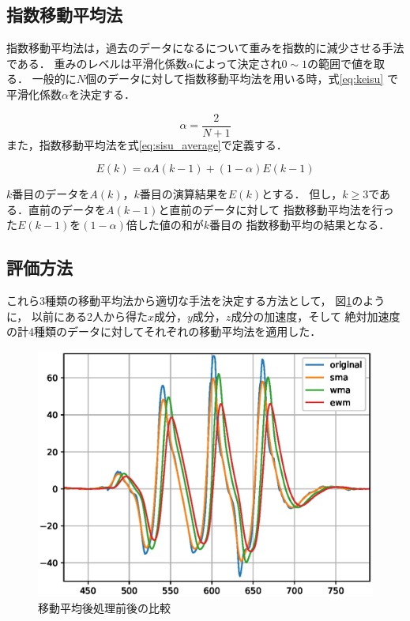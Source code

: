 \subsection{指数移動平均法}

指数移動平均法は，過去のデータになるについて重みを指数的に減少させる手法である．
重みのレベルは平滑化係数$\alpha$によって決定され$0 \sim 1$の範囲で値を取る．
一般的に$N$個のデータに対して指数移動平均法を用いる時，式\ref{eq:keisu}
で平滑化係数$\alpha$を決定する．

\begin{equation}
    \alpha = \frac{2}{N + 1}
    \label{eq:keisu}
\end{equation}
また，指数移動平均法を式\ref{eq:sisu_average}で定義する．

\begin{equation}
    E(k) = \alpha A(k - 1) + (1 - \alpha)E(k - 1)
    \label{eq:sisu_average}
\end{equation}

$k$番目のデータを$A(k)$，$k$番目の演算結果を$E(k)$とする．
但し，$k \geq 3$である．直前のデータを$A(k - 1)$と直前のデータに対して
指数移動平均法を行った$E(k - 1)$を$(1- \alpha)$倍した値の和が$k$番目の
指数移動平均の結果となる．

\subsection{評価方法}

これら3種類の移動平均法から適切な手法を決定する方法として，
図\ref{fig:average}のように，
以前にある2人から得た$x$成分，$y$成分，$z$成分の加速度，そして
絶対加速度の計4種類のデータに対してそれぞれの移動平均法を適用した．

\begin{figure}[tb]
    \vspace{-50mm}
    \hspace{0.3cm}
    \includegraphics[scale=0.6]{images_S2/KP2_20210416_average.eps}
    \vspace{35mm}
    \hspace{-3.5cm}
    \caption{移動平均後処理前後の比較}
    \label{fig:average}
\end{figure}


